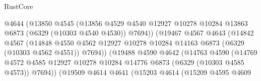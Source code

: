 \begin{lexlean}{RustCore}
\begin{coremodule}
                                      @4644
                                      (@13850
                                        @4545
                                        (@13856
                                          @4529
                                          @4540
                                          @12927
                                          @10278
                                          @10284
                                          @13863
                                          @6873
                                          (@6329 (@10303 @4540 @4530))
                                          @7694))
                                      (@19467
                                        @4567
                                        @4643
                                        (@14842
                                          @4567
                                          (@14848
                                            @4550
                                            @4562
                                            @12927
                                            @10278
                                            @10284
                                            @14163
                                            @6873
                                            (@6329 (@10303 @4562 @4551))
                                            @7694))
                                        (@19488
                                          @4590
                                          @4642
                                          (@14763
                                            @4590
                                            (@14769
                                              @4572
                                              @4585
                                              @12927
                                              @10278
                                              @10284
                                              @14776
                                              @6873
                                              (@6329 (@10303 @4585 @4573))
                                              @7694))
                                          (@19509
                                            @4614
                                            @4641
                                            (@15203
                                              @4614
                                              (@15209
                                                @4595
                                                @4609

\end{coremodule}
\end{lexlean}
